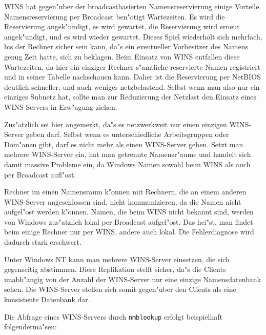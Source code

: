 \documentclass{scrartcl}\usepackage{pslatex}\typearea{12}
\newcommand{\prog}{\texttt}
\begin{document}

WINS hat gegen"uber der broadcastbasierten Namensreservierung einige
Vorteile. Namensreservierung per Broadcast ben"otigt Wartezeiten.  Es
wird die Reservierung angek"undigt, es wird gewartet, die Reservierung
wird erneut angek"undigt, und es wird wieder gewartet.  Dieses Spiel
wiederholt sich mehrfach, bis der Rechner sicher sein kann, da"s ein
eventueller Vorbesitzer des Namens genug Zeit hatte, sich zu beklagen.
Beim Einsatz von WINS entfallen diese Wartezeiten, da hier ein
einziger Rechner s"amtliche reservierte Namen registriert und in
seiner Tabelle nachschauen kann. Daher ist die Reservierung per
NetBIOS deutlich schneller, und auch weniger netzbelastend. Selbst
wenn man also nur ein einziges Subnetz hat, sollte man zur Reduzierung
der Netzlast den Einsatz eines WINS-Servers in Erw"agung ziehen.

Zus"atzlich sei hier angemerkt, da"s es netzwerkweit nur einen
einzigen WINS-Server geben darf. Selbst wenn es unterschiedliche
Arbeitsgruppen oder Dom"anen gibt, darf es nicht mehr als einen
WINS-Server geben. Setzt man mehrere WINS-Server ein, hat man
getrennte Namensr"aume und handelt sich damit massive Probleme ein, da
Windows Namen sowohl beim WINS als auch per Broadcast aufl"ost.

Rechner im einen Namensraum k"onnen mit Rechnern, die an einem anderen
WINS-Server angeschlossen sind, nicht kommunizieren, da die Namen
nicht aufgel"ost werden k"onnen. Namen, die beim WINS nicht bekannt
sind, werden von Windows zus"atzlich lokal per Broadcast aufgel"ost.
Das hei"st, man findet beim einige Rechner nur per WINS, andere auch
lokal. Die Fehlerdiagnose wird dadurch stark erschwert.

Unter Windows NT kann man mehrere WINS-Server einsetzen, die sich
gegenseitig abstimmen. Diese Replikation stellt sicher, da"s die
Clients unabh"angig von der Anzahl der WINS-Server nur eine einzige
Namensdatenbank sehen. Die WINS-Server stellen sich somit gegen"uber
den Clients als eine konsistente Datenbank dar.

Die Abfrage eines WINS-Servers durch \prog{nmblookup} erfolgt
beispielhaft folgenderma"sen:
\end{document}
